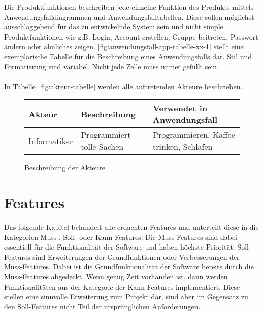 \begin{tcolorbox}
Die Produktfunktionen beschreiben jede einzelne Funktion des Produkts mittels Anwendungsfalldiagrammen und Anwendungsfalltabellen.
Diese sollen möglichst ausschlaggebend für das zu entwickelnde System sein und nicht simple Produktfunktionen wie z.B. Login, Account erstellen, Gruppe beitreten, Passwort ändern oder ähnliches zeigen.
\autoref{fig:anwendungsfall-app-tabelle-xx-1} stellt eine exemplarische Tabelle für die Beschreibung eines Anwendungsfalls dar. Stil und Formatierung sind variabel. Nicht jede Zelle muss immer gefüllt sein.
\\\\
In  Tabelle~\autoref{fig:akteur-tabelle} werden alle auftretenden Akteure beschrieben.


\end{tcolorbox}

\begin{figure}[h]
	\centering
	
	\begin{tabularx}{\textwidth}{ p{} | p{} | X }
		\textbf{Akteur} & \textbf{Beschreibung} & \textbf{Verwendet in Anwendungsfall} \\ \hline
		Informatiker & Programmiert tolle Sachen & Programmieren, Kaffee trinken, Schlafen
	\end{tabularx}
	
	\caption{Beschreibung der Akteure}
	\label{fig:akteur-tabelle}
\end{figure}

\section{Features}
Das folgende Kapitel behandelt alle erdachten Features und unterteilt diese in die Kategorien Muss-, Soll- oder Kann-Features. 
Die Muss-Features sind dabei essentiell für die Funktionalität der Software und haben höchste Priorität.
Soll-Features sind Erweiterungen der Grundfunktionen oder Verbesserungen der Muss-Features. Dabei ist die Grundfunktionalität der Software bereits durch die Muss-Features abgedeckt.
Wenn genug Zeit vorhanden ist, dann werden Funktionalitäten aus der Kategorie der Kann-Features implementiert. 
Diese stellen eine sinnvolle Erweiterung zum Projekt dar, sind aber im Gegensatz zu den Soll-Features nicht Teil der ursprünglichen Anforderungen.
